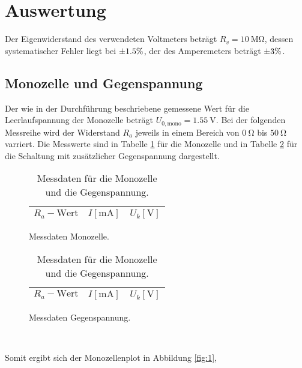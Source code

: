 \section{Auswertung}
\label{sec:Auswertung}
Der Eigenwiderstand des verwendeten Voltmeters beträgt $R_v=\SI{10}{\mega\ohm}$, dessen systematischer Fehler liegt bei $\num{+-1.5}\%$, der des Amperemeters beträgt $\num{+-3}\%$.
\subsection{Monozelle und Gegenspannung}
\label{ch:auswertung}
Der wie in der Durchführung beschriebene gemessene Wert für die Leerlaufspannung der Monozelle beträgt $U_{0,\text{mono}} = \SI{1.55}{\volt}$.
Bei der folgenden Messreihe wird der Widerstand $R_a$ jeweils in einem Bereich von $\SI{0}{\ohm}$ bis $\SI{50}{\ohm}$ varriert.
Die Messwerte sind in Tabelle \ref{tab:1} für die Monozelle und in Tabelle \ref{tab:2} für die Schaltung mit zusätzlicher Gegenspannung dargestellt.
\begin{table}
  \hspace*{\fill}
  \begin{subfigure}{0.40\textwidth}
  \centering
  \caption{Messdaten Monozelle.}
  \label{tab:1}
  \begin{tabular}{c c c}
    \toprule
    {$R_a-\text{Wert}$} & {$I [\si{\milli\ampere}]$} & {$U_k [\si{\volt}]$} \\
    \midrule
    
    \bottomrule
  \end{tabular}
\end{subfigure}
\hspace*{\fill}
\begin{subfigure}{0.40\textwidth}
  \centering
  \caption{Messdaten Gegenspannung.}
  \label{tab:2}
  \begin{tabular}{c c c}
    \toprule
    {$R_a-\text{Wert}$} & {$I [\si{\milli\ampere}]$} & {$U_k [\si{\volt}]$} \\
    \midrule
    
    \bottomrule
  \end{tabular}
\end{subfigure}
\\
\hspace*{\fill}
\hspace*{\fill}
\caption{Messdaten für die Monozelle und die Gegenspannung.}
\end{table}

Somit ergibt sich der Monozellenplot in Abbildung \ref{fig:1},

